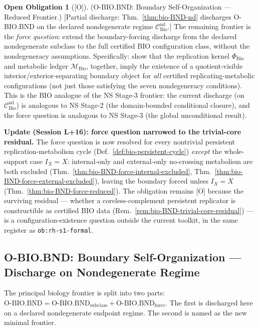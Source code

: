 \documentclass[12pt,oneside]{amsbook}
\theoremstyle{plain}
\theoremstyle{definition}
\newtheorem{obligation}[theorem]{Open Obligation}
\theoremstyle{remark}
\newcommand{\status}[1]{\textup{[#1]}}
\begin{document}
\begin{obligation}[\status{O}]\label{ob:bio-BND-open}
\textup{(O-BIO.BND: Boundary Self-Organization --- Reduced Frontier.)}
\textup{[Partial discharge: Thm.~\ref{thm:bio-BND-nd} discharges
O-BIO.BND on the declared nondegenerate regime
$\mathcal{C}^{\mathrm{nd}}_{\mathrm{Bio}}$.]}
The remaining frontier is the \emph{force question}: extend the
boundary-forcing discharge from the declared nondegenerate subclass
to the full certified BIO configuration class, without the
nondegeneracy assumptions.  Specifically: show that the
replication kernel $\Phi_{\mathrm{Bio}}$ and metabolic ledger
$\mathcal{M}_{\mathrm{Bio}}$, together, imply the existence of a
quotient-visible interior/exterior-separating boundary object for
\emph{all} certified replicating-metabolic configurations (not
just those satisfying the seven nondegeneracy conditions).
This is the BIO analogue of the NS Stage-3 frontier: the
current discharge (on $\mathcal{C}^{\mathrm{nd}}_{\mathrm{Bio}}$)
is analogous to NS Stage-2 (the domain-bounded conditional closure),
and the force question is analogous to NS Stage-3 (the global
unconditional result).

\textbf{Update (Session L+16): force question narrowed to the
trivial-core residual.}  The force question is now resolved for
every nontrivial persistent replication-metabolism cycle
(Def.~\ref{def:bio-persistent-cycle}) \emph{except} the
whole-support case $I_X = X$: internal-only and external-only
no-crossing metabolism are both excluded
(Thm.~\ref{thm:bio-BND-force-internal-excluded},
Thm.~\ref{thm:bio-BND-force-external-excluded}), leaving the
boundary forced unless $I_X = X$
(Thm.~\ref{thm:bio-BND-force-reduced}).  The obligation remains
[O] because the surviving residual --- whether a coreless-complement
persistent replicator is constructible as certified BIO data
(Rem.~\ref{rem:bio-BND-trivial-core-residual}) --- is a
configuration-existence question outside the current toolkit, in the
same register as \texttt{ob:rh-s1-formal}.
\end{obligation}

\subsection{O-BIO.BND: Boundary Self-Organization — Discharge on Nondegenerate Regime}
\label{sec:bio-BND-discharge}

The principal biology frontier is split into two parts:
$\mathrm{O\text{-}BIO.BND} = \mathrm{O\text{-}BIO.BND}_{\mathrm{subclass}}
+ \mathrm{O\text{-}BIO.BND}_{\mathrm{force}}$.
The first is discharged here on a declared nondegenerate endpoint
regime. The second is named as the new minimal frontier.
\end{document}
